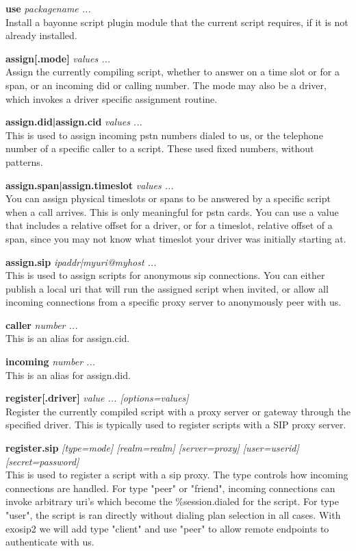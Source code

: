 \documentclass[a4paper,12pt]{article}
\begin{document}
{\bf use} {\it packagename ...} \\
        Install a bayonne script plugin module that the current script
        requires, if it is not already installed.

{\bf assign[.mode]} {\it values ...} \\
	Assign the currently compiling script, whether to answer on a time
	slot or for a span, or an incoming did or calling number.  The
	mode may also be a driver, which invokes a driver specific
	assignment routine.

{\bf assign.did|assign.cid} {\it values ...} \\
	This is used to assign incoming pstn numbers dialed to us, or
	the telephone number of a specific caller to a script.  These
	used fixed numbers, without patterns.

{\bf assign.span|assign.timeslot} {\it values ...} \\
	You can assign physical timeslots or spans to be answered by
	a specific script when a call arrives.  This is only meaningful
	for pstn cards.  You can use a value that includes a relative
	offset for a driver, or for a timeslot, relative offset of a
	span, since you may not know what timeslot your driver was
	initially starting at.

{\bf assign.sip} {\it ipaddr|myuri@myhost ...} \\
	This is used to assign scripts for anonymous sip connections.
	You can either publish a local uri that will run the assigned
	script when invited, or allow all incoming connections from
	a specific proxy server to anonymously peer with us.

{\bf caller} {\it number ...} \\
	This is an alias for assign.cid.

{\bf incoming} {\it number ...} \\
	This is an alias for assign.did.

{\bf register[.driver]} {\it value ... [options=values]} \\
	Register the currently compiled script with a proxy server or
	gateway through the specified driver.  This is typically used to
	register scripts with a SIP proxy server.

{\bf register.sip} {\it [type=mode] [realm=realm] [server=proxy] [user=userid] [secret=password]} \\
	This is used to register a script with a sip proxy.  The type controls
	how incoming connections are handled.  For type "peer" or "friend",
	incoming connections can invoke arbitrary uri's which become the
	\%session.dialed for the script.  For type "user", the script is
	ran directly without dialing plan selection in all cases.  With
	exosip2 we will add type "client" and use "peer" to allow remote
	endpoints to authenticate with us.
\end{document}
